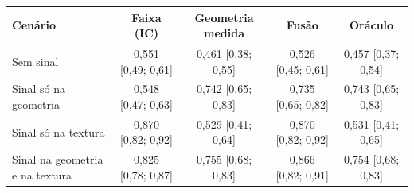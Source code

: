 \begin{tabular}{lcccc}
\toprule
Cenário & Faixa (IC) & Geometria medida & Fusão & Oráculo \\
\midrule
Sem sinal & 0,551 [0,49; 0,61] & 0,461 [0,38; 0,55] & 0,526 [0,45; 0,61] & 0,457 [0,37; 0,54] \\
Sinal só na geometria & 0,548 [0,47; 0,63] & 0,742 [0,65; 0,83] & 0,735 [0,65; 0,82] & 0,743 [0,65; 0,83] \\
Sinal só na textura & 0,870 [0,82; 0,92] & 0,529 [0,41; 0,64] & 0,870 [0,82; 0,92] & 0,531 [0,41; 0,65] \\
Sinal na geometria e na textura & 0,825 [0,78; 0,87] & 0,755 [0,68; 0,83] & 0,866 [0,82; 0,91] & 0,754 [0,68; 0,83] \\
\bottomrule
\end{tabular}
